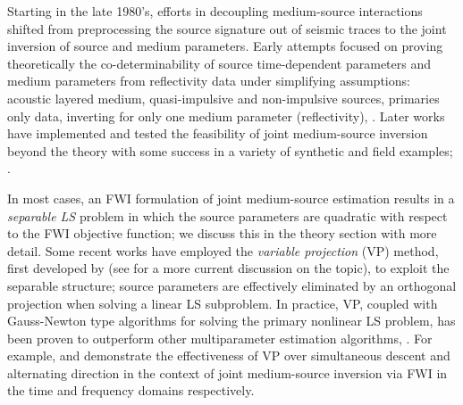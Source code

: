 Starting in the late 1980's, efforts in decoupling medium-source interactions shifted from preprocessing the source signature out of seismic traces to the joint inversion of source and medium parameters. 
Early attempts focused on proving theoretically the co-determinability of source time-dependent parameters and medium parameters from reflectivity data under simplifying assumptions: acoustic layered medium, quasi-impulsive and non-impulsive sources, primaries only data, inverting for only one medium parameter (reflectivity),  \citep{Ramm:85, Lew:89, BubeLaiSacksSanSy:88, MinkSym:95}. 
Later works have implemented and tested the feasibility of joint medium-source inversion beyond the theory with some success in a variety of synthetic and field examples; \citep{SymMink:97, Wang:09, Zhou:97}.

In most cases, an FWI formulation of joint medium-source estimation results in a \emph{separable LS} problem in which the source parameters are quadratic with respect to the FWI objective function; we discuss this in the theory section with more detail.
Some recent works have employed the \emph{variable projection} (VP) method, first developed by \cite{GolubPereyra:73} (see \cite{GolubPereyra:03} for a more current discussion on the topic), to exploit the separable structure;
source parameters are effectively eliminated by an orthogonal projection when solving a linear LS subproblem.
In practice, VP, coupled with Gauss-Newton type algorithms for solving the primary nonlinear LS problem, has been proven to outperform other multiparameter estimation algorithms, \citep{Ruhe:1980}.
For example, \cite{Rickett:SEG12} and \cite{LiRickettAbubakar:13} demonstrate the effectiveness of VP over simultaneous descent and alternating direction in the context of joint medium-source inversion via FWI in the time and frequency domains respectively.

